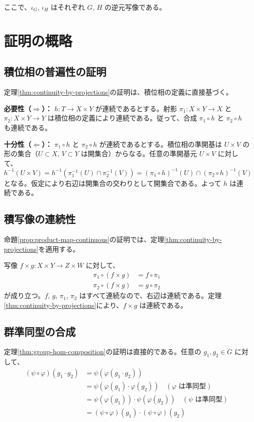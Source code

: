 \documentclass[uplatex, a4paper]{jlreq}
\newcommand{\comp}{\circ}
\begin{document}
ここで、$\iota_G$, $\iota_H$ はそれぞれ $G$, $H$ の逆元写像である。

\section{証明の概略}

\subsection{積位相の普遍性の証明}

定理\ref{thm:continuity-by-projections}の証明は、積位相の定義に直接基づく。

\textbf{必要性（$\Rightarrow$）：} $h: T \to X \times Y$ が連続であるとする。射影 $\pi_1: X \times Y \to X$ と $\pi_2: X \times Y \to Y$ は積位相の定義により連続である。従って、合成 $\pi_1 \comp h$ と $\pi_2 \comp h$ も連続である。

\textbf{十分性（$\Leftarrow$）：} $\pi_1 \comp h$ と $\pi_2 \comp h$ が連続であるとする。積位相の準開基は $U \times V$ の形の集合（$U \subset X$, $V \subset Y$ は開集合）からなる。任意の準開基元 $U \times V$ に対して、
\[
h^{-1}(U \times V) = h^{-1}(\pi_1^{-1}(U) \cap \pi_2^{-1}(V)) = (\pi_1 \comp h)^{-1}(U) \cap (\pi_2 \comp h)^{-1}(V)
\]
となる。仮定により右辺は開集合の交わりとして開集合である。よって $h$ は連続である。

\subsection{積写像の連続性}

命題\ref{prop:product-map-continuous}の証明では、定理\ref{thm:continuity-by-projections}を適用する。

写像 $f \times g: X \times Y \to Z \times W$ に対して、
\begin{align}
\pi_1 \comp (f \times g) &= f \comp \pi_1 \\
\pi_2 \comp (f \times g) &= g \comp \pi_2
\end{align}
が成り立つ。$f$, $g$, $\pi_1$, $\pi_2$ はすべて連続なので、右辺は連続である。定理\ref{thm:continuity-by-projections}により、$f \times g$ は連続である。

\subsection{群準同型の合成}

定理\ref{thm:group-hom-composition}の証明は直接的である。任意の $g_1, g_2 \in G$ に対して、
\begin{align}
(\psi \comp \varphi)(g_1 \cdot g_2) &= \psi(\varphi(g_1 \cdot g_2)) \\
&= \psi(\varphi(g_1) \cdot \varphi(g_2)) \quad (\varphi \text{ は準同型}) \\
&= \psi(\varphi(g_1)) \cdot \psi(\varphi(g_2)) \quad (\psi \text{ は準同型}) \\
&= (\psi \comp \varphi)(g_1) \cdot (\psi \comp \varphi)(g_2)
\end{align}
\end{document}
